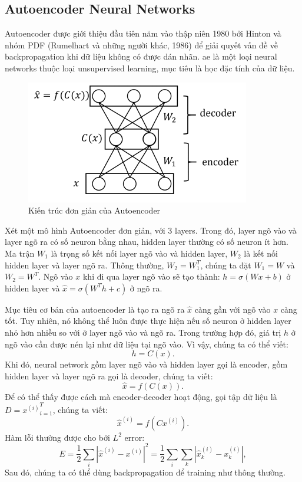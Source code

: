 \subsection{Autoencoder Neural Networks}
Autoencoder được giới thiệu đầu tiên năm vào thập niên 1980 bởi Hinton và nhóm PDF (Rumelhart và những người khác, 1986) để giải quyết vấn đề về backpropagation khi dữ liệu không có được dán nhãn. \ac{ae} là một loại neural networks thuộc loại unsupervised learning, mục tiêu là học đặc tính của dữ liệu. 
\begin{figure} [ht]
\centering
\captionsetup{justification=centering}
\includegraphics [scale=1] {Image/autoencoder_simple_model}
\caption{Kiến trúc đơn giản của Autoencoder}
\end{figure}
Xét một mô hình Autoencoder đơn giản,\cite{autoencoder_lecture_SNU} với 3 layers. Trong đó, layer ngõ vào và layer ngõ ra có số neuron bằng nhau, hidden layer thường có số neuron ít hơn. Ma trận $W_1$ là trọng số kết nối layer ngõ vào và hidden layer, $W_2$ là kết nối hidden layer và layer ngõ ra. Thông thường, $W_2 = W_1^T$, chúng ta đặt $W_1 = W$ và $W_2 = W^T$. Ngõ vào $x$ khi đi qua layer ngõ vào sẽ tạo thành: $h = \sigma(Wx + b)$ ở hidden layer và  $\hat x = \sigma(W^Th+c)$ ở ngõ ra. 

Mục tiêu cơ bản của autoencoder là tạo ra ngõ ra $\hat x$ càng gần với ngõ vào $x$ càng tốt. Tuy nhiên, nó không thể luôn được thực hiện nếu số neuron ở hidden layer nhỏ hơn nhiều so với ở layer ngõ vào và ngõ ra. Trong trường hợp đó, giá trị $h$ ở ngõ vào cần được nén lại như dữ liệu tại ngõ vào. Vì vậy, chúng ta có thể viết:
\begin{equation}
h = C(x).
\end{equation}
Khi đó, neural network gồm layer ngõ vào và hidden layer gọi là encoder, gồm hidden layer và layer ngõ ra gọi là decoder, chúng ta viết:
\begin{equation}
\hat x = f(C(x)).
\end{equation}
Để có thể thấy được cách mà encoder-decoder hoạt động, gọi tập dữ liệu là $D = {{x^{(i)}}_{i=1}^T}$, chúng ta viết:
\begin{equation}
\hat x^{(i)} = f(C{x^{(i)}}).
\end{equation}
Hàm lỗi thường được cho bởi $L^2$ error:
\begin{equation}
E = \frac {1}{2} \sum _i |\hat x ^ {(i)} - x^{(i)}|^2 = \frac{1}{2} \sum _i \sum _k |\hat x_k ^ {(i)} - x_k^{(i)}|, 
\end{equation}
Sau đó, chúng ta có thể dùng backpropagation để training như thông thường.
